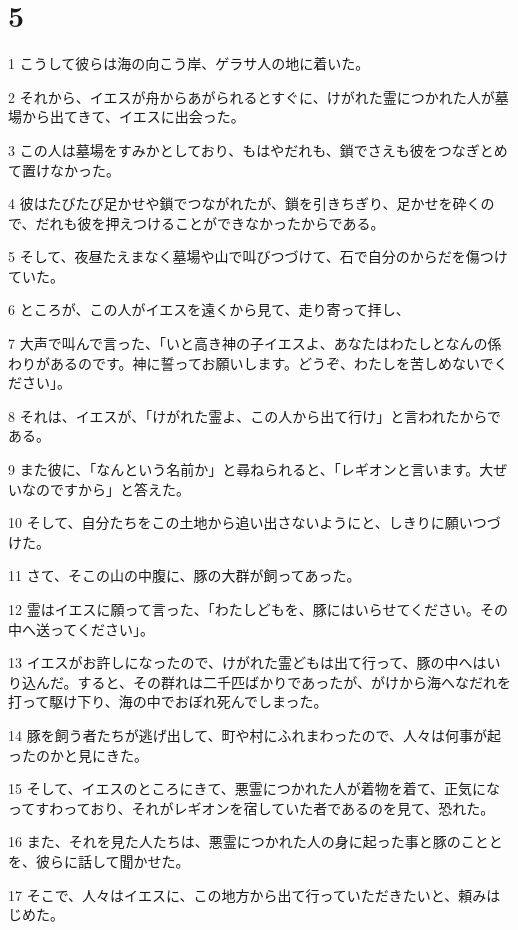 \chapter{5}

\par 1 こうして彼らは海の向こう岸、ゲラサ人の地に着いた。
\par 2 それから、イエスが舟からあがられるとすぐに、けがれた霊につかれた人が墓場から出てきて、イエスに出会った。
\par 3 この人は墓場をすみかとしており、もはやだれも、鎖でさえも彼をつなぎとめて置けなかった。
\par 4 彼はたびたび足かせや鎖でつながれたが、鎖を引きちぎり、足かせを砕くので、だれも彼を押えつけることができなかったからである。
\par 5 そして、夜昼たえまなく墓場や山で叫びつづけて、石で自分のからだを傷つけていた。
\par 6 ところが、この人がイエスを遠くから見て、走り寄って拝し、
\par 7 大声で叫んで言った、「いと高き神の子イエスよ、あなたはわたしとなんの係わりがあるのです。神に誓ってお願いします。どうぞ、わたしを苦しめないでください」。
\par 8 それは、イエスが、「けがれた霊よ、この人から出て行け」と言われたからである。
\par 9 また彼に、「なんという名前か」と尋ねられると、「レギオンと言います。大ぜいなのですから」と答えた。
\par 10 そして、自分たちをこの土地から追い出さないようにと、しきりに願いつづけた。
\par 11 さて、そこの山の中腹に、豚の大群が飼ってあった。
\par 12 霊はイエスに願って言った、「わたしどもを、豚にはいらせてください。その中へ送ってください」。
\par 13 イエスがお許しになったので、けがれた霊どもは出て行って、豚の中へはいり込んだ。すると、その群れは二千匹ばかりであったが、がけから海へなだれを打って駆け下り、海の中でおぼれ死んでしまった。
\par 14 豚を飼う者たちが逃げ出して、町や村にふれまわったので、人々は何事が起ったのかと見にきた。
\par 15 そして、イエスのところにきて、悪霊につかれた人が着物を着て、正気になってすわっており、それがレギオンを宿していた者であるのを見て、恐れた。
\par 16 また、それを見た人たちは、悪霊につかれた人の身に起った事と豚のこととを、彼らに話して聞かせた。
\par 17 そこで、人々はイエスに、この地方から出て行っていただきたいと、頼みはじめた。
